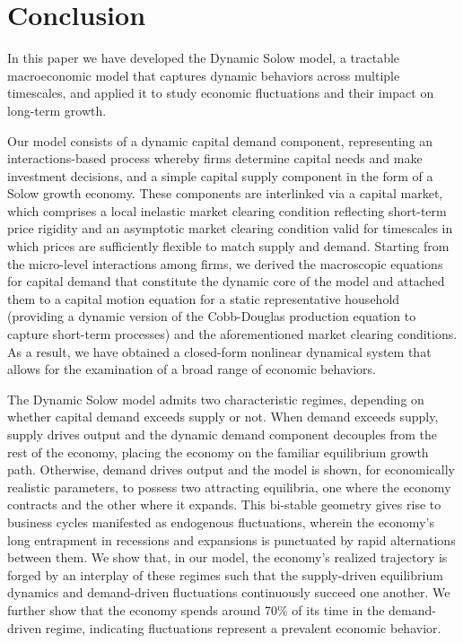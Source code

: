 \documentclass[authoryear, review]{elsarticle}
\begin{document}

\section{Conclusion}\label{sec_conclusion}

In this paper we have developed the Dynamic Solow model, a tractable macroeconomic model that captures dynamic behaviors across multiple timescales, and applied it to study economic fluctuations and their impact on long-term growth. 

Our model consists of a dynamic capital demand component, representing an interactions-based process whereby firms determine capital needs and make investment decisions, and a simple capital supply component in the form of a Solow growth economy. These components are interlinked via a capital market, which comprises a local inelastic market clearing condition reflecting short-term price rigidity and an asymptotic market clearing condition valid for timescales in which prices are sufficiently flexible to match supply and demand. Starting from the micro-level interactions among firms, we derived the macroscopic equations for capital demand that constitute the dynamic core of the model and attached them to a capital motion equation for a static representative household (providing a dynamic version of the Cobb-Douglas production equation to capture short-term processes) and the aforementioned market clearing conditions. As a result, we have obtained a closed-form nonlinear dynamical system that allows for the examination of a broad range of economic behaviors. 

The Dynamic Solow model admits two characteristic regimes, depending on whether capital demand exceeds supply or not. When demand exceeds supply, supply drives output and the dynamic demand component decouples from the rest of the economy, placing the economy on the familiar equilibrium growth path. Otherwise, demand drives output and the model is shown, for economically realistic parameters, to possess two attracting equilibria, one where the economy contracts and the other where it expands. This bi-stable geometry gives rise to business cycles manifested as endogenous fluctuations, wherein the economy’s long entrapment in recessions and expansions is punctuated by rapid alternations between them. We show that, in our model, the economy’s realized trajectory is forged by an interplay of these regimes such that the supply-driven equilibrium dynamics and demand-driven fluctuations continuously succeed one another. We further show that the economy spends around 70\% of its time in the demand-driven regime, indicating fluctuations represent a prevalent economic behavior.
\end{document}
